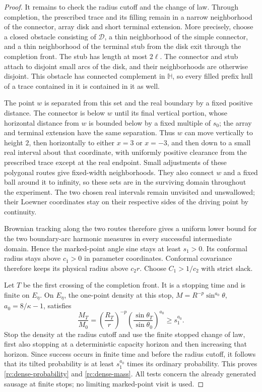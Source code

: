 \documentclass[11pt]{article}
\theoremstyle{definition}
\theoremstyle{remark}
\numberwithin{equation}{section}
\begin{document}
\begin{proof}
It remains to check the radius cutoff and the change of law.  Through
completion, the prescribed trace and its filling remain in a narrow
neighborhood of the connector, array disk and short terminal extension.
More precisely, choose a closed obstacle consisting of $\mathcal D$,
a thin neighborhood of the simple connector, and a thin neighborhood of
the terminal stub from the disk exit through the completion front.
The stub has length at most $2\ell$. The connector and stub attach to
disjoint small arcs of the disk, and their neighborhoods are otherwise
disjoint. This obstacle has
connected complement in $\mathbb H$, so every filled prefix hull of a
trace contained in it is contained in it as well.

The point $w$ is separated from this set and the real boundary by a
fixed positive distance.  The connector is below $w$ until its final
vertical portion, whose horizontal distance from $w$ is bounded below
by a fixed multiple of $s_0$; the array and terminal extension have the
same separation.  Thus $w$ can move vertically to height $2$, then
horizontally to either $x=3$ or $x=-3$, and then down to a small real
interval about that coordinate, with uniformly positive clearance from
the prescribed trace except at the real endpoint.  Small adjustments
of these polygonal routes give fixed-width neighborhoods.  They also
connect $w$ and a fixed ball around it to infinity, so these sets are
in the surviving domain throughout the experiment.  The two chosen
real intervals remain unvisited and unswallowed; their Loewner
coordinates stay on their respective sides of the driving point by
continuity.

Brownian tracking along the two routes therefore gives
a uniform lower bound for the two boundary-arc harmonic measures in
every successful intermediate domain.  Hence the
marked-point angle sine stays at least $s_1>0$.  Its conformal radius
stays above $c_1>0$ in parameter coordinates.  Conformal covariance
therefore keeps its physical radius above $c_2r$.  Choose $C_1>1/c_2$
with strict slack.

Let $T$ be the first crossing of the completion front. It is a stopping
time and is finite on $E_\eta$. On $E_\eta$, the one-point density at
this stop,
$M=R^{-p}\sin^{a_0}\theta$, $a_0=8/\kappa-1$, satisfies
\[
 \frac{M_T}{M_0}
 =\left(\frac{R_T}{r}\right)^{-p}
     \left(\frac{\sin\theta_T}{\sin\theta_0}\right)^{a_0}
 \ge s_1^{a_0}.
\]
Stop the density at the radius cutoff and use the finite stopped
change of law, first also stopping at a deterministic capacity horizon
and then increasing that horizon.  Since success occurs in finite
time and before the radius cutoff, it follows that its tilted
probability is at least $s_1^{a_0}$ times its ordinary probability.
This proves \eqref{rc:dense-probability} and
\eqref{rc:dense-mass}.  All tests concern the already generated
sausage at finite stops; no limiting marked-point visit is used.
\end{proof}
\end{document}

